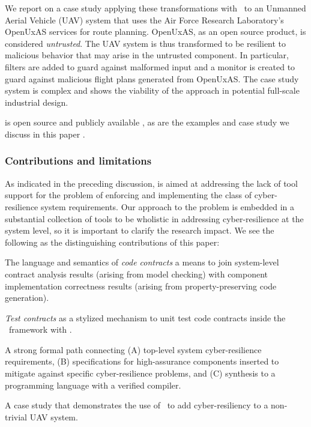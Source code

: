 We report on a case study applying these transformations with \brfcs\
to an Unmanned Aerial Vehicle (UAV) system that uses the Air Force
Research Laboratory's OpenUxAS services for route planning.  OpenUxAS,
as an open source product, is considered \emph{untrusted}.  The UAV
system is thus transformed to be resilient to malicious behavior that
may arise in the untrusted component.  In particular, filters are
added to guard against malformed input and a monitor is created to
guard against malicious flight plans generated from OpenUxAS. The case
study system is complex and shows the viability of the approach in
potential full-scale industrial design.

{\brfcs} is open source and publicly available \cite{fmide}, as are the
examples and case study we discuss in this paper \cite{repo,
phase2, camkes, case}.

\subsubsection*{Contributions and limitations}

As indicated in the preceding discussion, {\brfcs} is aimed at
addressing the lack of tool support for the problem of enforcing
and implementing the class of cyber-resilience system
requirements.  Our approach to the problem is embedded in a
substantial collection of tools to be wholistic in addressing cyber-resilience at the system level, so it is important to clarify the
research impact. We see the following as the distinguishing
contributions of this paper:

\begin{compactitem}
  \item The language and semantics of \emph{code contracts}   a
  means to join system-level contract analysis results (arising from
  model checking) with component implementation correctness results
  (arising from property-preserving code generation).

  \item \emph{Test contracts} as a
  stylized mechanism to unit test code contracts inside the \brfcs\
  framework with \agr.

  \item A strong formal path connecting (A) top-level system cyber-resilience
  requirements, (B) specifications for high-assurance components
  inserted to mitigate against specific cyber-resilience problems, and
  (C) synthesis to a programming language with a verified compiler.

  \item A case study that demonstrates the use of \brfcs\ to add cyber-resiliency
  to a non-trivial UAV system.
\end{compactitem}

